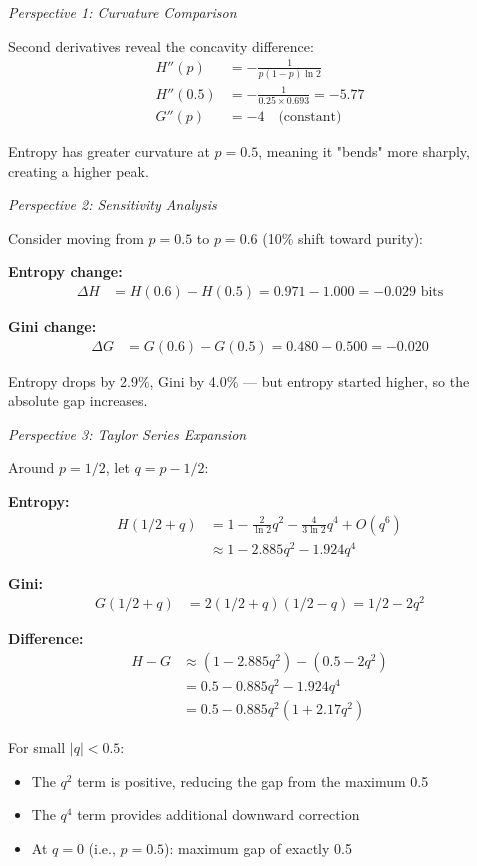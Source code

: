 \documentclass[12pt]{article}
\begin{document}
\begin{explanation}
\textit{Perspective 1: Curvature Comparison}

Second derivatives reveal the concavity difference:
\begin{align*}
H''(p) &= -\frac{1}{p(1-p)\ln 2} \\
H''(0.5) &= -\frac{1}{0.25 \times 0.693} = -5.77 \\
G''(p) &= -4 \quad \text{(constant)}
\end{align*}

Entropy has greater curvature at $p=0.5$, meaning it "bends" more sharply, creating a higher peak.

\textit{Perspective 2: Sensitivity Analysis}

Consider moving from $p=0.5$ to $p=0.6$ (10\% shift toward purity):

\textbf{Entropy change:}
\begin{align*}
\Delta H &= H(0.6) - H(0.5) = 0.971 - 1.000 = -0.029 \text{ bits}
\end{align*}

\textbf{Gini change:}
\begin{align*}
\Delta G &= G(0.6) - G(0.5) = 0.480 - 0.500 = -0.020
\end{align*}

Entropy drops by 2.9\%, Gini by 4.0\% — but entropy started higher, so the absolute gap increases.

\textit{Perspective 3: Taylor Series Expansion}

Around $p = 1/2$, let $q = p - 1/2$:

\textbf{Entropy:}
\begin{align*}
H(1/2 + q) &= 1 - \frac{2}{\ln 2}q^2 - \frac{4}{3\ln 2}q^4 + O(q^6) \\
&\approx 1 - 2.885q^2 - 1.924q^4
\end{align*}

\textbf{Gini:}
\begin{align*}
G(1/2 + q) &= 2(1/2 + q)(1/2 - q) = 1/2 - 2q^2
\end{align*}

\textbf{Difference:}
\begin{align*}
H - G &\approx (1 - 2.885q^2) - (0.5 - 2q^2) \\
&= 0.5 - 0.885q^2 - 1.924q^4 \\
&= 0.5 - 0.885q^2(1 + 2.17q^2)
\end{align*}

For small $|q| < 0.5$:
\begin{itemize}
    \item The $q^2$ term is positive, reducing the gap from the maximum 0.5
    \item The $q^4$ term provides additional downward correction
    \item At $q=0$ (i.e., $p=0.5$): maximum gap of exactly 0.5
\end{itemize}


\end{explanation}
\end{document}
